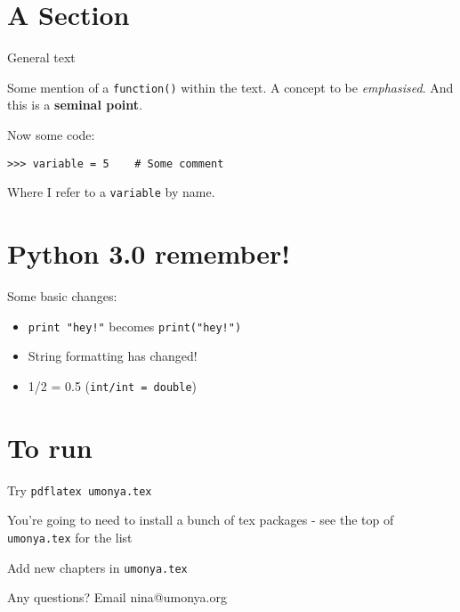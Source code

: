 \section{A Section}
General text

Some mention of a \texttt{function()} within the text. A concept to be \textit{emphasised}. And this is a \textbf{seminal point}.

Now some code:
\begin{lstlisting}
>>> variable = 5    # Some comment
\end{lstlisting}

Where I refer to a \texttt{variable} by name.

\section{Python 3.0 remember!}

Some basic changes:
\begin{itemize}
    \item \texttt{print "hey!"} becomes \texttt{print("hey!")}
    \item String formatting has changed!
    \item 1/2 = 0.5 (\texttt{int/int = double})
\end{itemize}

\section{To run}
Try \texttt{pdflatex umonya.tex}

You're going to need to install a bunch of tex packages - see the top of \texttt{umonya.tex} for the list

Add new chapters in \texttt{umonya.tex}

Any questions? Email nina@umonya.org 
